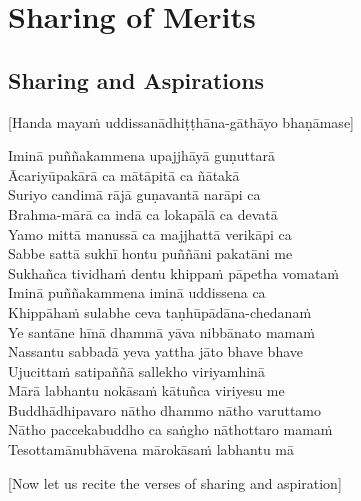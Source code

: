 
\chapter{Sharing of Merits}

\section{Sharing and Aspirations}
\label{sharing-aspirations}

\begin{center}
  [Handa mayaṁ uddissanādhiṭṭhāna-gāthāyo bhaṇāmase]
\end{center}

Iminā puññakammena upajjhāyā guṇuttarā\\
Ācariyūpakārā ca mātāpitā ca ñātakā\\
Suriyo candimā rājā guṇavantā narāpi ca\\
Brahma-mārā ca indā ca lokapālā ca devatā\\
Yamo mittā manussā ca majjhattā verikāpi ca\\
Sabbe sattā sukhī hontu puññāni pakatāni me\\
Sukhañca tividhaṁ dentu khippaṁ pāpetha vomataṁ\\
Iminā puññakammena iminā uddissena ca\\
Khippāhaṁ sulabhe ceva taṇhūpādāna-chedanaṁ\\
Ye santāne hīnā dhammā yāva nibbānato mamaṁ\\
Nassantu sabbadā yeva yattha jāto bhave bhave\\
Ujucittaṁ satipaññā sallekho viriyamhinā\\
Mārā labhantu nokāsaṁ kātuñca viriyesu me\\
Buddhādhipavaro nātho dhammo nātho varuttamo\\
Nātho paccekabuddho ca saṅgho nāthottaro mamaṁ\\
Tesottamānubhāvena mārokāsaṁ labhantu mā


\begin{center}
  [Now let us recite the verses of sharing and aspiration]
\end{center}

